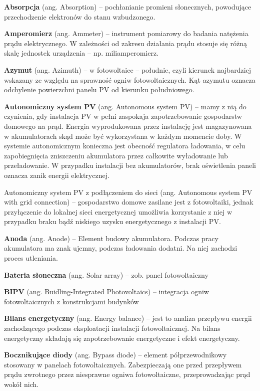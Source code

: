 \documentclass[12pt,a4paper]{article}
\begin{document}
\textbf{Absorpcja} (ang. Absorption) – pochłanianie promieni słonecznych, powodujące przechodzenie elektronów do stanu wzbudzonego.

\textbf{Amperomierz} (ang. Ammeter) – instrument pomiarowy do badania natężenia prądu elektrycznego. W zależności od zakresu działania prądu stosuje się różną skalę jednostek urządzenia – np. miliamperomierz.

\textbf{Azymut} (ang. Azimuth) – w fotowoltaice – południe, czyli kierunek najbardziej wskazany ze względu na sprawność ogniw fotowoltaicznych. Kąt azymutu oznacza odchylenie powierzchni panelu PV od kierunku południowego.

\textbf{Autonomiczny system PV} (ang. Autonomous system PV) – mamy z nią do czynienia, gdy instalacja PV w pełni zaspokaja zapotrzebowanie gospodarstw domowego na prąd. Energia wyprodukowana przez instalację jest magazynowana w akumulatorach skąd może być wykorzystana w każdym momencie doby. W systemie autonomicznym konieczna jest obecność regulatora ładowania, w celu zapobiegnięcia zniszczeniu akumulatora przez całkowite wyładowanie lub przeładowanie. W przypadku instalacji bez akumulatorów, brak oświetlenia paneli oznacza zanik energii elektrycznej.

Autonomiczny system PV z podłączeniem do sieci (ang. Autonomous system PV with grid connection) – gospodarstwo domowe zasilane jest z fotowoltaiki, jednak przyłączenie do lokalnej sieci energetycznej umożliwia korzystanie z niej w przypadku braku bądź niskiego uzysku energetycznego z instalacji PV.

\textbf{Anoda} (ang. Anode) – Element budowy akumulatora. Podczas pracy akumulatora ma znak ujemny, podczas ładowania dodatni. Na niej zachodzi proces utleniania.


\textbf{Bateria słoneczna} (ang. Solar array) – zob. panel fotowoltaiczny

\textbf{BIPV} (ang. Buidling-Integrated Photovoltaics) – integracja ogniw fotowoltaicznych z konstrukcjami budynków

\textbf{Bilans energetyczny} (ang. Energy balance) – jest to analiza przepływu energii zachodzącego podczas eksploatacji instalacji fotowoltaicznej.  Na bilans energetyczny składają się zapotrzebowanie energetyczne i efekt energetyczny.

\textbf{Bocznikujące diody} (ang. Bypass diode) – element półprzewodnikowy stosowany w panelach fotowoltaicznych. Zabezpieczają one przed przepływem prądu zwrotnego przez niesprawne ogniwa fotowoltaiczne, przeprowadzając prąd wokół nich.
\end{document}
